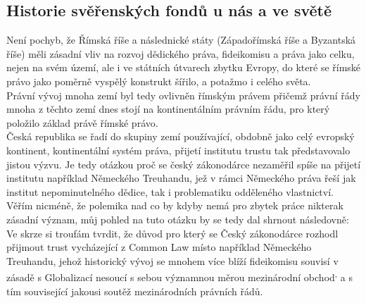 \documentclass{article}
\begin{document}



\subsection{Historie svěřenských fondů u nás a ve světě}

Není pochyb, že Římská říše a následnické státy (Západořímská říše a Byzantská říše) měli zásadní vliv na rozvoj dědického práva, fideikomisu a práva jako celku, nejen na svém území, ale i ve státních útvarech zbytku Evropy, do které se římské právo jako poměrně vyspělý konstrukt šířilo, a potažmo i celého světa.\\

 Právní vývoj mnoha zemí byl tedy ovlivněn římským právem přičemž právní řády mnoha z těchto zemí dnes stojí na kontinentálním právním řádu, pro který položilo základ právě římské právo.\\

 Česká republika se řadí do skupiny zemí používající, obdobně jako celý evropský kontinent, kontinentální systém práva, přijetí institutu trustu tak představovalo jistou výzvu. Je tedy otázkou proč se český zákonodárce nezaměřil spíše na přijetí institutu například Německého Treuhandu, jež v rámci Německého práva řeší jak institut nepominutelného dědice, tak i problematiku odděleného vlastnictví. Věřím nicméně, že polemika nad co by kdyby nemá pro zbytek práce nikterak zásadní význam, můj pohled na tuto otázku by se tedy dal shrnout následovně: Ve skrze si troufám tvrdit, že důvod pro který se Český zákonodárce rozhodl přijmout trust vycházející z Common Law místo například Německého Treuhandu, jehož historický vývoj se mnohem více blíží fideikomisu souvisí v zásadě s Globalizací nesoucí s sebou významnou měrou mezinárodní obchod\textsuperscript{,} a s tím související jakousi soutěž mezinárodních právních řádů.\\
 
\end{document}
